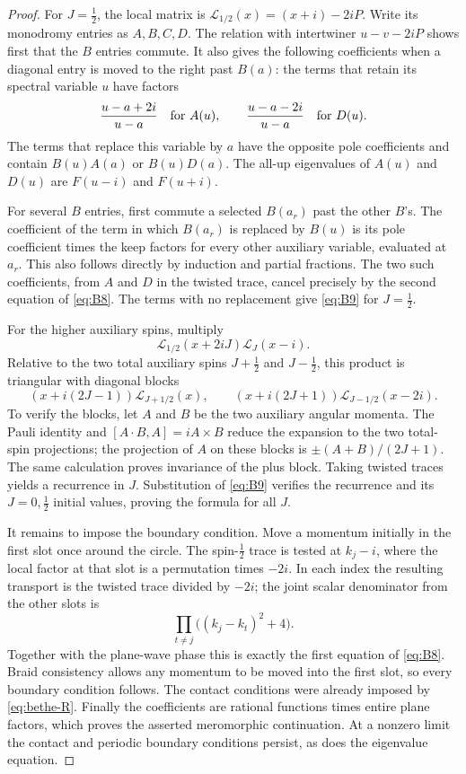 \begin{proof}
For $J=\frac12$, the local matrix is
$\mathcal L_{1/2}(x)=(x+i)-2iP$.  Write its monodromy entries as $A,B,C,D$.
The relation with intertwiner $u-v-2iP$ shows first that the $B$ entries
commute.  It also gives the following coefficients when a diagonal entry
is moved to the right past $B(a)$: the terms that retain its spectral
variable $u$ have factors
\[
 \frac{u-a+2i}{u-a}\quad\hbox{for }A(u),
 \qquad
 \frac{u-a-2i}{u-a}\quad\hbox{for }D(u).
\]
The terms that replace this variable by $a$ have the opposite pole
coefficients and contain $B(u)A(a)$ or $B(u)D(a)$.  The all-up eigenvalues
of $A(u)$ and $D(u)$ are $F(u-i)$ and $F(u+i)$.

For several $B$ entries, first commute a selected $B(a_r)$ past the other
$B$'s.  The coefficient of the term in which $B(a_r)$ is replaced by
$B(u)$ is its pole coefficient times the keep factors for every other
auxiliary variable, evaluated at $a_r$.  This also follows directly by
induction and partial fractions.  The two such coefficients, from $A$
and $D$ in the twisted trace, cancel precisely by the second equation
of \eqref{eq:B8}.  The terms with no replacement give \eqref{eq:B9}
for $J=\frac12$.

For the higher auxiliary spins, multiply
\[
 \mathcal L_{1/2}(x+2iJ)\mathcal L_J(x-i).
\]
Relative to the two total auxiliary spins $J+\frac12$ and $J-\frac12$,
this product is triangular with diagonal blocks
\[
 (x+i(2J-1))\mathcal L_{J+1/2}(x),
 \qquad
 (x+i(2J+1))\mathcal L_{J-1/2}(x-2i).
\]
To verify the blocks, let $A$ and $B$ be the two auxiliary angular momenta.
The Pauli identity and $[A\cdot B,A]=iA\times B$ reduce the expansion to
the two total-spin projections; the projection of $A$ on these blocks is
$\pm(A+B)/(2J+1)$.  The same calculation proves invariance of the plus
block.  Taking twisted traces yields a recurrence in $J$.  Substitution
of \eqref{eq:B9} verifies the recurrence and its $J=0,\frac12$ initial
values, proving the formula for all $J$.

It remains to impose the boundary condition.  Move a momentum initially
in the first slot once around the circle.  The spin-$\frac12$ trace is
tested at $k_j-i$, where the local factor at that slot is a permutation
times $-2i$.  In each index the resulting transport is the twisted trace
divided by $-2i$; the joint scalar denominator from the other slots is
\[
 \prod_{t\ne j}\bigl((k_j-k_t)^2+4\bigr).
\]
Together with the plane-wave phase this is exactly the first equation
of \eqref{eq:B8}.  Braid consistency allows any momentum to be moved into
the first slot, so every boundary condition follows.  The contact
conditions were already imposed by \eqref{eq:bethe-R}.  Finally the
coefficients are rational functions times entire plane factors, which
proves the asserted meromorphic continuation.  At a nonzero limit the
contact and periodic boundary conditions persist, as does the eigenvalue
equation.
\end{proof}

